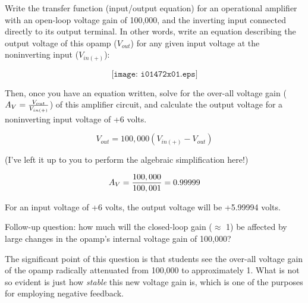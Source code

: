 

Write the transfer function (input/output equation) for an operational amplifier with an open-loop voltage gain of 100,000, and the inverting input connected directly to its output terminal.  In other words, write an equation describing the output voltage of this opamp ($V_{out}$) for any given input voltage at the noninverting input ($V_{in(+)}$):

$$\texttt{[image: i01472x01.eps]}$$

Then, once you have an equation written, solve for the over-all voltage gain ($A_V = {V_{out} \over V_{in(+)}}$) of this amplifier circuit, and calculate the output voltage for a noninverting input voltage of +6 volts.







$$V_{out} = 100,000(V_{in(+)} - V_{out})$$

(I've left it up to you to perform the algebraic simplification here!)

$$A_V = {100,000 \over 100,001} = 0.99999$$

\vskip 10pt

For an input voltage of +6 volts, the output voltage will be +5.99994 volts.

\vskip 10pt

Follow-up question: how much will the closed-loop gain ($\approx$ 1) be affected by large changes in the opamp's internal voltage gain of 100,000?







The significant point of this question is that students see the over-all voltage gain of the opamp radically attenuated from 100,000 to approximately 1.  What is not so evident is just how {\it stable} this new voltage gain is, which is one of the purposes for employing negative feedback.




